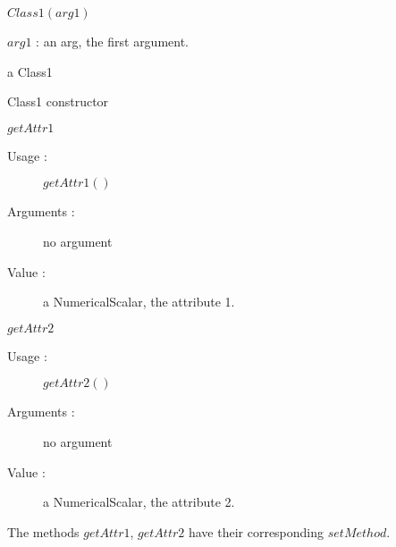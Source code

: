 \begin{description}

\item[Usage :] \rule{0pt}{1em}
  \begin{description}
  \item $Class1(arg1)$
  \end{description}

\item[Arguments :]  \rule{0pt}{1em}
  \begin{description}
  \item $arg1$ : an arg, the first argument.
  \end{description}

\item[Value :] a Class1

\item[Details :]  \rule{0pt}{1em}
  \begin{description}
  \item Class1 constructor
  \end{description}

\item $getAttr1$
    \begin{description}
    \item[Usage :] $getAttr1()$
    \item[Arguments :] no argument
    \item[Value :] a NumericalScalar, the attribute 1.
    \end{description}
    \bigskip
    
\item $getAttr2$
    \begin{description}
    \item[Usage :] $getAttr2()$
    \item[Arguments :] no argument
    \item[Value :] a NumericalScalar, the attribute 2.
    \end{description}
    \bigskip
The methods $getAttr1$, $getAttr2$ have their corresponding $setMethod$.

\item[Links] \rule{0pt}{1em}
\end{description}

